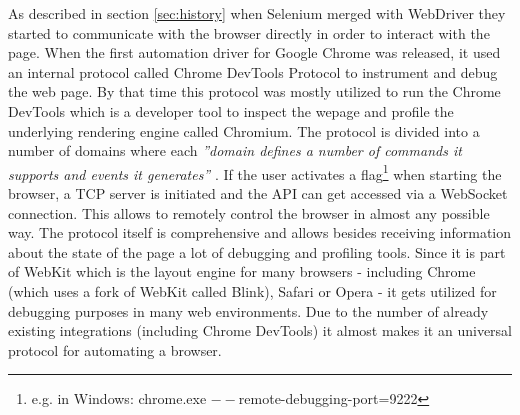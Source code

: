 As described in section \ref{sec:history} when Selenium merged with WebDriver they started to communicate with the browser directly in order to interact with the page. When the first automation driver for Google Chrome was released, it used an internal protocol called Chrome DevTools Protocol to instrument and debug the web page. By that time this protocol was mostly utilized to run the Chrome DevTools which is a developer tool to inspect the wepage and profile the underlying rendering engine called Chromium. The protocol is divided into a number of domains where each \textit{''domain defines a number of commands it supports and events it generates''} \cite{devtoolsprotocol}. If the user activates a flag\footnote{e.g. in Windows: chrome.exe $--$remote-debugging-port=9222} when starting the browser, a TCP server is initiated and the API can get accessed via a WebSocket connection. This allows to remotely control the browser in almost any possible way. The protocol itself is comprehensive and allows besides receiving information about the state of the page a lot of debugging and profiling tools. Since it is part of WebKit which is the layout engine for many browsers - including Chrome (which uses a fork of WebKit called Blink), Safari or Opera - it gets utilized for debugging purposes in many web environments. Due to the number of already existing integrations (including Chrome DevTools) it almost makes it an universal protocol for automating a browser.
